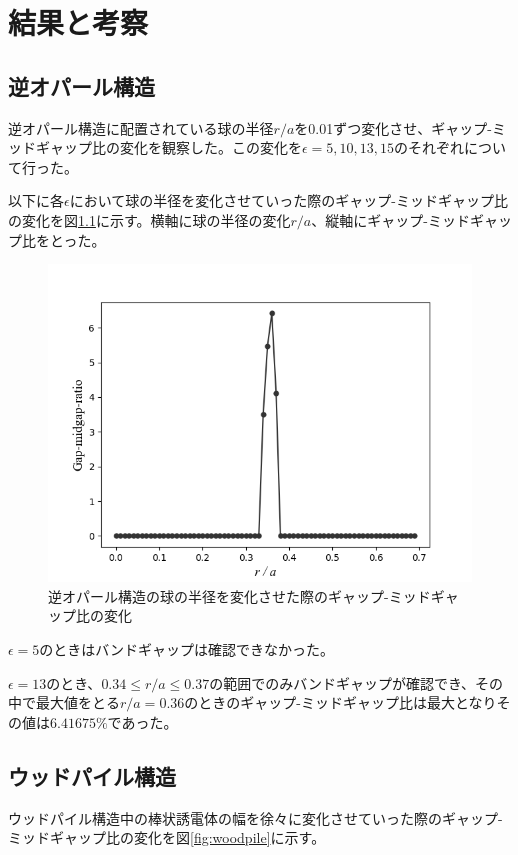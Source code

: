 \documentclass[platex,dvipdfmx]{jsreport}
\numberwithin{equation}{section}
\begin{document}
\chapter{結果と考察}


\section{逆オパール構造}
逆オパール構造に配置されている球の半径$r / a$を0.01ずつ変化させ、ギャップ-ミッドギャップ比の変化を観察した。この変化を$\epsilon = 5, 10, 13, 15$のそれぞれについて行った。

以下に各$\epsilon$において球の半径を変化させていった際のギャップ-ミッドギャップ比の変化を図\ref{fig:inv_opal}に示す。横軸に球の半径の変化$r / a$、縦軸にギャップ-ミッドギャップ比をとった。

\begin{figure}[htbp]
  \centering
  \includegraphics[width=0.6\linewidth]{results/inv_opals.png}
  \caption{逆オパール構造の球の半径を変化させた際のギャップ-ミッドギャップ比の変化}
  \label{fig:inv_opal}
\end{figure}

$\epsilon = 5$のときはバンドギャップは確認できなかった。

$\epsilon = 13$のとき、$0.34 \leq r / a \leq 0.37$の範囲でのみバンドギャップが確認でき、その中で最大値をとる$r / a = 0.36$のときのギャップ-ミッドギャップ比は最大となりその値は$6.41675 \% $であった。



\section{ウッドパイル構造}
ウッドパイル構造中の棒状誘電体の幅を徐々に変化させていった際のギャップ-ミッドギャップ比の変化を図\ref{fig:woodpile}に示す。
\end{document}

